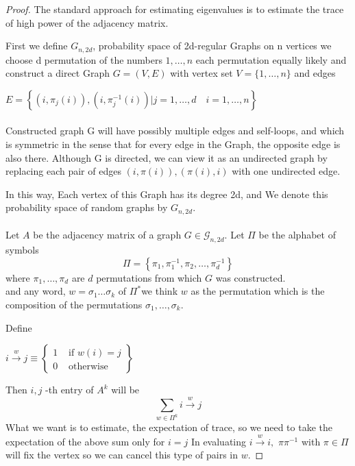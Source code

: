 \documentclass[oneside]{book}
\begin{document}
	\begin{proof}
		The standard approach for estimating eigenvalues is to estimate the trace of high power of the adjacency matrix.\par
		First we define ${G}_{n, 2d}$, probability space of 2d-regular Graphs on n vertices    we choose d permutation of the numbers ${1,\ldots , n}$ each permutation equally likely and construct a direct Graph $G = (V,E) $ with  vertex set $V=\{1, \ldots, n\}$ and edges\par
		$E=\left\{\left(i, \pi_{j}(i)\right),\left(i, \pi_{j}^{-1}(i)\right) | j=1, \ldots, d \quad i=1, \ldots, n\right\}$ \\\\
		Constructed graph G will have possibly multiple edges and self-loops, and which is symmetric in the sense that for every edge in the Graph, the opposite edge is also there. Although G is directed, we can view it as an undirected graph by
		replacing each pair of edges $(i, \pi(i)), (\pi(i), i) $ with one undirected edge.\par In this way, Each vertex of this Graph has its degree 2d, and  We denote
		this probability space of random graphs by $G_{n,2d}$. \\\\
		Let $A$ be the adjacency matrix of a graph $G \in \mathscr{G}_{n, 2 d}$. Let $\Pi$ be the alphabet of symbols
		$$
		\Pi=\left\{\pi_{1}, \pi_{1}^{-1}, \pi_{2}, \ldots, \pi_{d}^{-1}\right\}
		$$
		where  $\pi_{1}, \ldots, \pi_{d}$ are  $d$ permutations from which $G$ was constructed. \\
		  and any word, $w=\sigma_{1} \ldots \sigma_{k}$ of $\Pi^{*}$we think $w$ as the permutation which is the composition of the permutations $\sigma_{1}, \ldots, \sigma_{k} .$ \par
		Define  \begin{center}
			$i \stackrel{w}{\rightarrow} j \equiv\left\{\begin{array}{ll}
			1 & \text { if  }  w(i)=j \\
			0 & \text { otherwise }
			\end{array}\right\}$ 
		\end{center}
		Then  $i, j$ -th entry of $A^{k}$ will be 
		$$
		\sum_{w \in \Pi^{k}} i \stackrel{w}{\rightarrow} j
		$$
		What we want is  to estimate, the expectation of  trace, so we need to take the expectation of the above sum only for  $i = j$      
		In evaluating $i \stackrel{w}{\rightarrow} i,$  $\pi \pi^{-1}$ with $\pi \in \Pi $    will fix the vertex so we can cancel this type of pairs in  $w$.\par

\end{proof}
\end{document}
